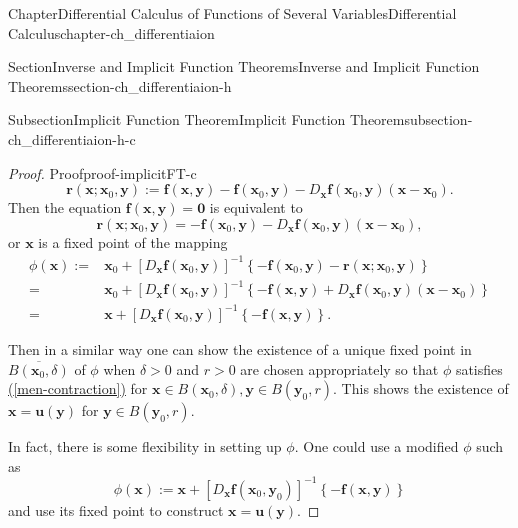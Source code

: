 \documentclass[oneside,10pt,]{book}
\newcommand{\xreffont}{\relax}
\numberwithin{equation}{section}
\newcommand{\amp}{&}
\begin{document}
\begin{chapterptx}{Chapter}{Differential Calculus of Functions of Several Variables}{}{Differential Calculus}{}{}{chapter-ch_differentiaion}
\begin{sectionptx}{Section}{Inverse and Implicit Function Theorems}{}{Inverse and Implicit Function Theorems}{}{}{section-ch_differentiaion-h}
\begin{subsectionptx}{Subsection}{Implicit Function Theorem}{}{Implicit Function Theorem}{}{}{subsection-ch_differentiaion-h-c}
\begin{proof}{Proof}{}{proof-implicitFT-c}
\begin{equation*}
{\mathbf r}({\mathbf x}; {\mathbf x}_{0}, {\mathbf y}):={\mathbf f}({\mathbf x}, {\mathbf y})-
{\mathbf f}({\mathbf x}_{0}, {\mathbf y})-D_{{\mathbf x}} {\mathbf f}({\mathbf x}_{0}, {\mathbf y})
({\mathbf x}-{\mathbf x}_{0}).
\end{equation*}
Then the equation \({\mathbf f}({\mathbf x}, {\mathbf y})={\mathbf 0}\) is equivalent to%
\begin{equation*}
{\mathbf r}({\mathbf x}; {\mathbf x}_{0}, {\mathbf y})=-
{\mathbf f}({\mathbf x}_{0}, {\mathbf y})-D_{{\mathbf x}} {\mathbf f}({\mathbf x}_{0}, {\mathbf y})
({\mathbf x}-{\mathbf x}_{0}),
\end{equation*}
or \({\mathbf x}\) is a fixed point of the mapping%
\begin{align*}
\phi ({\mathbf x}) := \amp {\mathbf x}_{0} + 
\left[D_{{\mathbf x}}{\mathbf f}({\mathbf x}_{0}, {\mathbf y})\right]^{-1}
\left\{ - {\mathbf f}({\mathbf x}_{0}, {\mathbf y})
-{\mathbf r}({\mathbf x}; {\mathbf x}_{0}, {\mathbf y})\right\}\\
=\amp {\mathbf x}_{0} + 
\left[D_{{\mathbf x}}{\mathbf f}({\mathbf x}_{0}, {\mathbf y})\right]^{-1}
\left\{ - {\mathbf f}({\mathbf x}, {\mathbf y}) + D_{{\mathbf x}}{\mathbf f}({\mathbf x}_{0}, {\mathbf y})({\mathbf x}-{\mathbf x}_{0}) \right\}\\
=\amp {\mathbf x}+ \left[D_{{\mathbf x}}{\mathbf f}({\mathbf x}_{0}, {\mathbf y})\right]^{-1}
\left\{ - {\mathbf f}({\mathbf x}, {\mathbf y}) \right\}.
\end{align*}
%
\par
Then in a similar way one can show the existence of a unique fixed point in \(\overline{B({\mathbf x}_{0}, \delta)}\) of \(\phi \) when \(\delta>0\) and \(r>0\) are chosen appropriately so that \(\phi\) satisfies \hyperref[men-contraction]{({\xreffont\ref{men-contraction}})} for \({\mathbf x} \in B({\mathbf x}_{0}, \delta), {\mathbf y}\in B({\mathbf y}_0, r) \). This shows the existence of \({\mathbf x} = {\mathbf u}({\mathbf y})\) for \({\mathbf y}\in B({\mathbf y}_0, r) \).%
\par
In fact, there is some flexibility in setting up \(\phi\). One could use a modified \(\phi\) such as%
\begin{equation*}
\phi ({\mathbf x}) :={\mathbf x}+ 
\left[D_{{\mathbf x}}{\mathbf f}({\mathbf x}_{0}, {\mathbf y}_{0})\right]^{-1}
\left\{ - {\mathbf f}({\mathbf x}, {\mathbf y}) \right\}
\end{equation*}
and use its fixed point to construct \({\mathbf x} = {\mathbf u}({\mathbf y})\).%

\end{proof}
\end{subsectionptx}
\end{sectionptx}
\end{chapterptx}
\end{document}
